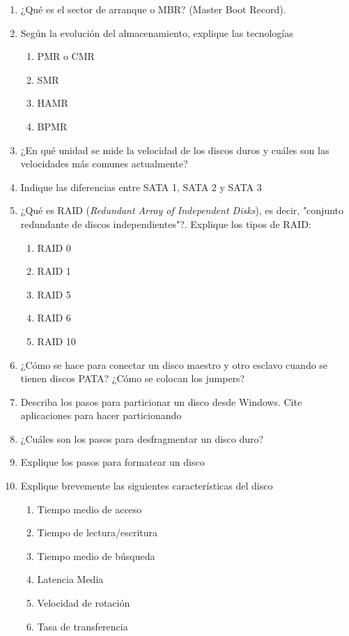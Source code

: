 \documentclass[stu, 12pt, letterpaper, donotrepeattitle, floatsintext, natbib, helv]{apa7}
\begin{document}
\begin{enumerate}
    \item ¿Qué es el sector de arranque o MBR? (Master Boot Record).
    

    
    \item Según la evolución del almacenamiento, explique las tecnologías
    \begin{enumerate}
        \item PMR o CMR
        \item SMR
        \item HAMR
        \item BPMR
    \end{enumerate}
    \item ¿En qué unidad se mide la velocidad de los discos duros y cuáles son las velocidades más comunes actualmente?
    \item Indique las diferencias entre SATA 1, SATA 2 y SATA 3
    \item ¿Qué es RAID (\textit{Redundant Array of Independent Disks}), es decir, "conjunto redundante de discos independientes"?. Explique los tipos de RAID:
    \begin{enumerate}
        \item RAID 0
        \item RAID 1
        \item RAID 5
        \item RAID 6
        \item RAID 10
    \end{enumerate}
    \item ¿Cómo se hace para conectar un disco maestro y otro esclavo cuando se tienen discos PATA? ¿Cómo se colocan los jumpers?
    \item Describa los pasos para particionar un disco desde Windows. Cite aplicaciones para hacer particionando
    \item ¿Cuáles son los pasos para desfragmentar un disco duro?
    \item Explique los pasos para formatear un disco
    \item Explique brevemente las siguientes características del disco
    \begin{enumerate}
        \item Tiempo medio de acceso
        \item Tiempo de lectura/escritura
        \item Tiempo medio de búsqueda
        \item Latencia Media
        \item Velocidad de rotación
        \item Tasa de transferencia
    \end{enumerate}
\end{enumerate}
\end{document}
